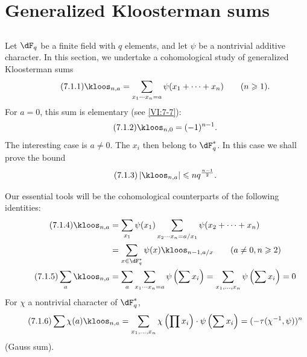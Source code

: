 \section{Generalized Kloosterman sums}\label{VI:7}





\subsection{}\label{VI:7-1}

Let $\dF_q$ be a finite field with $q$ elements, and let $\psi$ be a nontrivial 
additive character. In this section, we undertake a cohomological study of 
generalized Kloosterman sums 
\begin{equation*}\tag{7.1.1}\label{VI:eq:7-1-1}
  \kloos_{n,a} = \sum_{x_1\dotsm x_n = a} \psi(x_1+\cdots + x_n) \qquad (n\geqslant 1) \text{.} 
\end{equation*}
For $a=0$, this sum is elementary (see \ref{VI:7-7}): 
\begin{equation*}\tag{7.1.2}\label{VI:eq:7-1-2}
  \kloos_{n,0} = (-1)^{n-1} \text{.} 
\end{equation*}
The interesting case is $a\ne 0$. The $x_i$ then belong to 
$\dF_q^\ast$. In this case we shall prove the bound 
\begin{equation*}\tag{7.1.3}\label{VI:eq:7-1-3}
  \left|\kloos_{n,a}\right| \leqslant n q^{\frac{n-1}{2}} \text{.} 
\end{equation*}

Our essential tools will be the cohomological counterparts of the 
following identities: 
\begin{align*}\tag{7.1.4}\label{VI:eq:7-1-4}
  \kloos_{n,a} &= \sum_{x_1} \psi(x_1) \sum_{x_2\dotsm x_n = a/x_1} \psi(x_2+\cdots + x_n) \\ \notag
    &= \sum_{x\in \dF_q^\ast} \psi(x) \kloos_{n-1,a/x} \qquad (a\ne 0,n\geqslant 2) \\ \tag{7.1.5}\label{VI:eq:7-1-5}
  \sum_a \kloos_{n,a} &= \sum_a \sum_{x_1 \dotsm x_n = a} \psi\left(\sum x_i\right) = \sum_{x_1,\dots,x_n} \psi\left(\sum x_i\right) = 0 
\end{align*}
For $\chi$ a nontrivial character of $\dF_q^\ast$, 
\begin{equation*}\tag{7.1.6}\label{VI:eq:7-1-6}
  \sum \chi(a) \kloos_{n,a} = \sum_{x_1,\dots,x_n} \chi\left(\prod x_i\right) \cdot \psi\left(\sum x_i\right) = (-\tau(\chi^{-1},\psi))^n 
\end{equation*}
(Gauss sum). 





